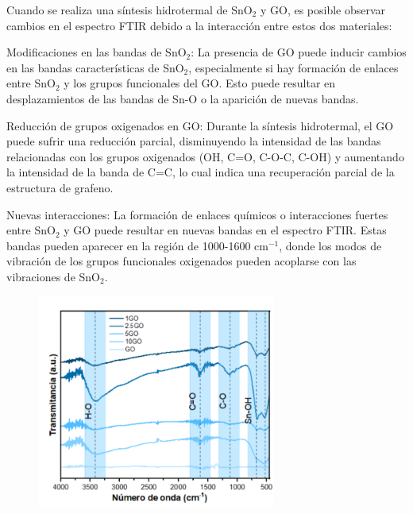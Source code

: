 \documentclass[12pt]{article}
\begin{document}
Cuando se realiza una síntesis hidrotermal de SnO$\displaystyle _{2}$ y GO, es posible observar cambios en el espectro FTIR debido a la interacción entre estos dos materiales:\vspace{1em} %

Modificaciones en las bandas de SnO$\displaystyle _{2}$: La presencia de GO puede inducir cambios en las bandas características de SnO$\displaystyle _{2}$, especialmente si hay formación de enlaces entre SnO$\displaystyle _{2}$ y los grupos funcionales del GO. Esto puede resultar en desplazamientos de las bandas de Sn-O o la aparición de nuevas bandas.\vspace{1em} %

Reducción de grupos oxigenados en GO: Durante la síntesis hidrotermal, el GO puede sufrir una reducción parcial, disminuyendo la intensidad de las bandas relacionadas con los grupos oxigenados (OH, C=O, C-O-C, C-OH) y aumentando la intensidad de la banda de C=C, lo cual indica una recuperación parcial de la estructura de grafeno.\vspace{1em} %

Nuevas interacciones: La formación de enlaces químicos o interacciones fuertes entre SnO$\displaystyle _{2}$ y GO puede resultar en nuevas bandas en el espectro FTIR. Estas bandas pueden aparecer en la región de 1000-1600 cm$\displaystyle ^{-1}$, donde los modos de vibración de los grupos funcionales oxigenados pueden acoplarse con las vibraciones de SnO$\displaystyle _{2}$.

\begin{figure}[H]
    	   \begin{center}
     	  	\includegraphics[width = 0.7\textwidth]{Imagenes/SnO2@GO_FTIR_2.png}
    	   \end{center} 
        \end{figure}
\end{document}
